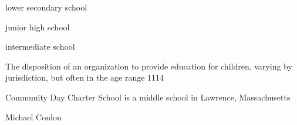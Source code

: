 \documentclass[letterpaper,10pt,english]{sphinxmanual}
\begin{document}
\begin{sphinxShadowBox}

\sphinxAtStartPar
lower secondary school

\sphinxAtStartPar
junior high school

\sphinxAtStartPar
intermediate school
\end{sphinxShadowBox}

\begin{sphinxShadowBox}

\sphinxAtStartPar
{\hyperref[\detokenize{doc-BFO_0000016::doc}]{}}
\end{sphinxShadowBox}

\begin{sphinxShadowBox}

\sphinxAtStartPar
The disposition of an organization to provide education for children, varying by jurisdiction, but often in the age range 11\sphinxhyphen{}14
\end{sphinxShadowBox}

\begin{sphinxShadowBox}

\sphinxAtStartPar
{}
\end{sphinxShadowBox}

\begin{sphinxShadowBox}

\sphinxAtStartPar
Community Day Charter School is a middle school in Lawrence, Massachusetts
\end{sphinxShadowBox}

\begin{sphinxShadowBox}

\sphinxAtStartPar
Michael Conlon 
\end{sphinxShadowBox}
\begin{quote}

\ignorespaces \end{quote}
\end{document}

